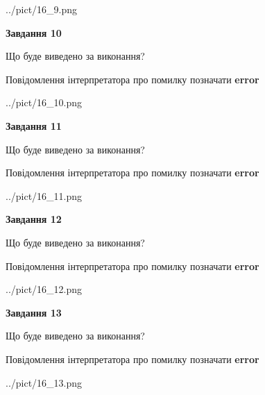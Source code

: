 \documentclass[11pt, ukrainian]{article}
\begin{document}
{\begin {large}
\begin{center}
	{../pict/16_9.png}
\end{center}
\newpage

{\begin {center}\textbf{Завдання 10}\end {center}}\par
Що буде виведено за виконання? \par
Повідомлення інтерпретатора про помилку позначати \textbf{error}

\begin{center}
	{../pict/16_10.png}
\end{center}
\newpage

{\begin {center}\textbf{Завдання 11}\end {center}}\par
Що буде виведено за виконання? \par
Повідомлення інтерпретатора про помилку позначати \textbf{error}

\begin{center}
	{../pict/16_11.png}
\end{center}
\newpage

{\begin {center}\textbf{Завдання 12}\end {center}}\par
Що буде виведено за виконання? \par
Повідомлення інтерпретатора про помилку позначати \textbf{error}

\begin{center}
	{../pict/16_12.png}
\end{center}
\newpage

{\begin {center}\textbf{Завдання 13}\end {center}}\par
Що буде виведено за виконання? \par
Повідомлення інтерпретатора про помилку позначати \textbf{error}

\begin{center}
	{../pict/16_13.png}
\end{center}
\newpage


\end{large}}
\end{document}
